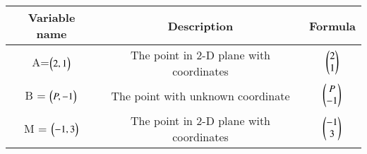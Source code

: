 \begin{center}
	\begin{tabular}{|c|c|c|}
    \hline
    \textbf{Variable name} & \textbf{Description} & \textbf{Formula}\\ 
    \hline
		A=$\begin{pmatrix}2, 1\end{pmatrix}$ & The point in 2-D plane with coordinates & $\begin{pmatrix}2\\ 1\end{pmatrix}$ \\
    \hline 
		B = $\begin{pmatrix}P, -1\end{pmatrix}$ & The point with unknown coordinate  & $\begin{pmatrix}P \\ -1\end{pmatrix}$ \\
    \hline
		M = $\begin{pmatrix}-1, 3\end{pmatrix}$ & The point in 2-D plane with coordinates & $\begin{pmatrix}-1\\3\end{pmatrix}$ \\
    \hline   
    \end{tabular}
\end{center}
